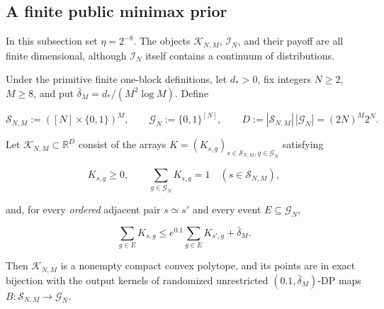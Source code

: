 \subsection{A finite public minimax prior}\label{app:step-004}
In this subsection set $\eta=2^{-8}$.  The objects
$\mathcal K_{N,M}$, $\mathcal I_N$, and their payoff are all finite
dimensional, although $\mathcal I_N$ itself contains a continuum of
distributions.
\begin{lemma}\label{lem:step-004-kernel-polytope}
Under the primitive finite one-block definitions, let \(d_*>0\), fix
integers \(N\ge2\), \(M\ge8\), and put
\(\bar\delta_M=d_*/(M^2\log M)\). Define

\[
\mathcal S_{N,M}:=([N]\times\{0,1\})^M,
\qquad
\mathcal G_N:=\{0,1\}^{[N]},
\qquad
D:=|\mathcal S_{N,M}|\,|\mathcal G_N|=(2N)^M2^N.
\]

Let \(\mathcal K_{N,M}\subset\mathbb R^D\) consist of the arrays
\(K=(K_{s,g})_{s\in\mathcal S_{N,M},g\in\mathcal G_N}\) satisfying

\[
K_{s,g}\ge0,
\qquad
\sum_{g\in\mathcal G_N}K_{s,g}=1
\quad(s\in\mathcal S_{N,M}),
\tag{6}
\]

and, for every \emph{ordered} adjacent pair \(s\simeq s'\) and every event
\(E\subseteq\mathcal G_N\),

\[
\sum_{g\in E}K_{s,g}
\le
e^{0.1}\sum_{g\in E}K_{s',g}+\bar\delta_M.
\tag{7}
\]

Then \(\mathcal K_{N,M}\) is a nonempty compact convex polytope, and its
points are in exact bijection with the output kernels of randomized
unrestricted \((0.1,\bar\delta_M)\)-DP maps
\(B:\mathcal S_{N,M}\to\mathcal G_N\).
\end{lemma}

